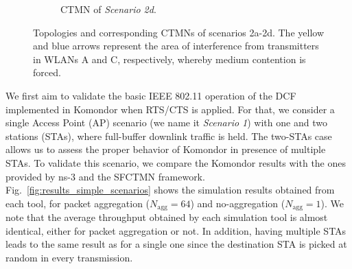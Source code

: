 \documentclass[conference]{IEEEtran}
\begin{document}
\begin{figure}[ht!]
\begin{subfigure}{0.24\textwidth}
			\caption{CTMN of \textit{Scenario 2d}.} \label{fig:c_d}
		\end{subfigure}
		\caption{Topologies and corresponding CTMNs of scenarios 2a-2d. The yellow and blue arrows represent the area of interference from transmitters in WLANs A and C, respectively, whereby medium contention is forced.}
		\label{fig:complex_scenarios}
	\end{figure}
	
	We first aim to validate the basic IEEE 802.11 operation of the DCF implemented in Komondor when RTS/CTS is applied. For that, we consider a single Access Point (AP) scenario (we name it \textit{Scenario 1}) with one and two stations (STAs), where full-buffer downlink traffic is held. The two-STAs case allows us to assess the proper behavior of Komondor in presence of multiple STAs. To validate this scenario, we compare the Komondor results with the ones provided by ns-3 and the SFCTMN framework. Fig.~\ref{fig:results_simple_scenarios} shows the simulation results obtained from each tool, for packet aggregation ($N_{\text{agg}} = 64$) and no-aggregation ($N_{\text{agg}} = 1$). We note that the average throughput obtained by each simulation tool is almost identical, either for packet aggregation or not. In addition, having multiple STAs leads to the same result as for a single one since the destination STA is picked at random in every transmission.
	
\end{document}
